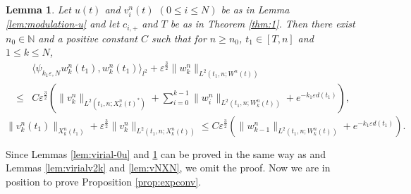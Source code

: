 \documentclass[11pt]{amsart}
\newtheorem{lemma}[theorem]{Lemma}
\theoremstyle{remark}
\numberwithin{equation}{section}
\begin{document}
\begin{lemma}
  \label{lem:locenergy-ku}
Let $u(t)$ and $v_i^n(t)$ $(0\le i\le N)$ be as in Lemma \ref{lem:modulation-u}
and let $c_{i,+}$ and $T$ be as in Theorem \ref{thm:1}.
Then there exist $n_0\in{\mathbb{N}}$ and a positive constant $C$ such that 
for $n\ge n_0$, $t_1\in[T,n]$ and $1\le k\le N$,
\begin{align*}
&{\langle}\psi_{k_1{\varepsilon},N}w_k^n(t_1),w_k^n(t_1){\rangle}_{l^2}
+ {\varepsilon}^{\frac32}\|w_k^n\|_{L^2(t_1,n;W^n(t))}
\\ \le & C{\varepsilon}^{\frac32}\left(\|v_k^n\|_{L^2(t_1,n;X_k^n(t)^*)}
+\sum_{i=0}^{k-1}\|w_i^n\|_{L^2(t_1,n;W_k^n(t))}+e^{-k_1{\varepsilon} d(t_1)}\right),
\end{align*} 
$$\|v_k^n(t_1)\|_{X_k^n(t_1)}+{\varepsilon}^{\frac32}\|v_k^n\|_{L^2(t_1,n;X_k^n(t))}
\le C{\varepsilon}^{\frac32}\left(\|w_{k-1}^n\|_{L^2(t_1,n;W_k^n(t))}+e^{-k_1{\varepsilon} d(t_1)}\right).$$
\end{lemma}
Since Lemmas \ref{lem:virial-0u} and  \ref{lem:locenergy-ku} can be proved
in the same way as \cite[Lemma 3.2]{Mi2} and Lemmas \ref{lem:virialv2k} and
\ref{lem:vNXN}, we omit the proof.
Now we are in position to prove Proposition \ref{prop:expconv}.
\end{document}
